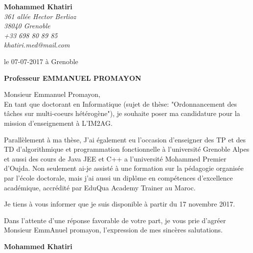 \documentclass[11pt]{letter}
\begin{document}
 \sffamily
 \hfill
 \begin{flushleft}
 {\bfseries Mohammed Khatiri}\\[.35ex]
 \small\itshape
 361 allée Hector Berlioz\\
 38040 Grenoble\\[.35ex]
 +33 698 80 89 85\\
 khatiri.med@mail.com
 \end{flushleft}
 \begin{flushright}
  le 07-07-2017 à Grenoble\\
 \end{flushright}


 \begin{flushright}
 {\bfseries Professeur EMMANUEL PROMAYON}\\[.35ex]
     \small\itshape
 \end{flushright}
 \bigskip
 \bigskip
 \bigskip
  Monsieur Emmanuel Promayon,\\

 En tant que doctorant en Informatique (sujet de thèse: "Ordonnancement des tâches sur multi-coeurs hétérogène"),
 je souhaite poser ma candidature pour la mission d'enseignement à L'IM2AG. 

Parallèlement à ma thèse,
J’ai également eu l’occasion d'enseigner des TP et des TD d'algorithmique et
programmation fonctionnelle à l'université Grenoble Alpes
et aussi des cours de Java JEE et C++ a l'université Mohammed Premier d'Oujda.
Non seulement ai-je assisté à une formation sur la pédagogie organisée par l'école doctorale,
mais j'ai aussi un diplôme en compétences d’excellence académique, accrédité par EduQua Academy Trainer au Maroc.

Je tiens à vous informer que je suis disponible à partir du 17 novembre 2017.

Dans l'attente d'une réponse favorable de votre part, je vous prie d'agréer Monsieur EmmAnuel promayon, l'expression de mes sincères salutations.\\


 \begin{center}
 {\bfseries Mohammed Khatiri}\\
 \end{center}
 \vfill
 
\end{document}
